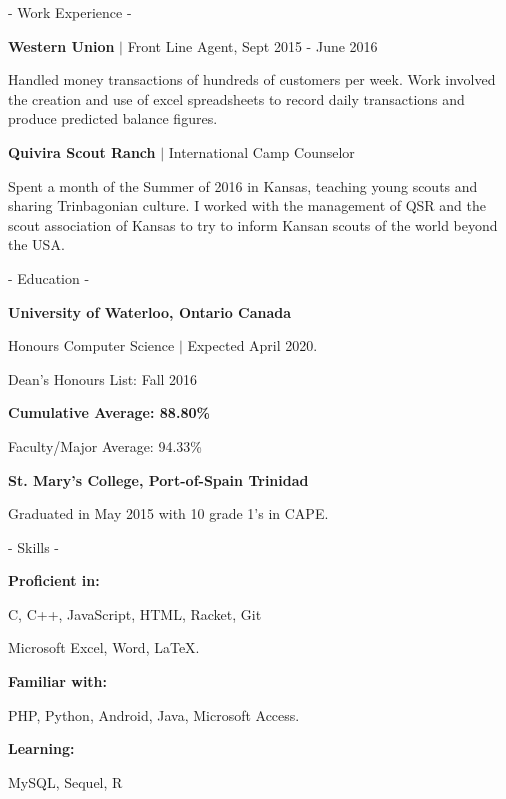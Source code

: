 \documentclass[twocolumn]{article}
\begin{document}
\begin{twocolumn}

{\Large\sc - Work Experience -} \smallskip\par
{\large\sffamily\bf Western Union} $|$
{\small\sffamily\lsstyle Front Line Agent, Sept 2015 - June 2016} \par
{\selectfont Handled money transactions of hundreds of customers per week. Work involved the creation and use of excel spreadsheets to record daily transactions and produce predicted balance figures.}
\smallskip

{\large\sffamily\bf Quivira Scout Ranch} $|$
{\small\sffamily\lsstyle International Camp Counselor} \par
{\selectfont Spent a month of the Summer of 2016 in Kansas, teaching young scouts and sharing Trinbagonian culture. I worked with the management of QSR and the scout association of Kansas to try to inform Kansan scouts of the world beyond the USA.} \par
\bigskip

{\Large\sc - Education -} \smallskip\par
{\large\sffamily\bf University of Waterloo, \footnotesize Ontario Canada} \par
{\small{}\selectfont Honours Computer Science $|$ Expected April 2020. \smallskip\par
Dean's Honours List: Fall 2016 \par
\bf Cumulative Average: 88.80\% \par
Faculty/Major Average: 94.33\%}
\medskip

{\large\sffamily\bf St. Mary's College, \footnotesize Port-of-Spain Trinidad} \par
{\small{}\selectfont Graduated in May 2015 with 10 grade 1's in CAPE.}
\bigskip

{\Large\sc - Skills -} \smallskip\par
{\large\sffamily\bf Proficient in: \par}
{\small{}\selectfont C, C++, JavaScript, HTML, Racket, Git\par Microsoft Excel, Word, \LaTeX.}\par
{\large\sffamily\bf Familiar with: \par}
{\small{}\selectfont PHP, Python, Android, Java, Microsoft Access.}\par
{\large\sffamily\bf Learning: \par}
{\small{}\selectfont MySQL, Sequel, R}\par
\bigskip



\end{twocolumn}
\end{document}
